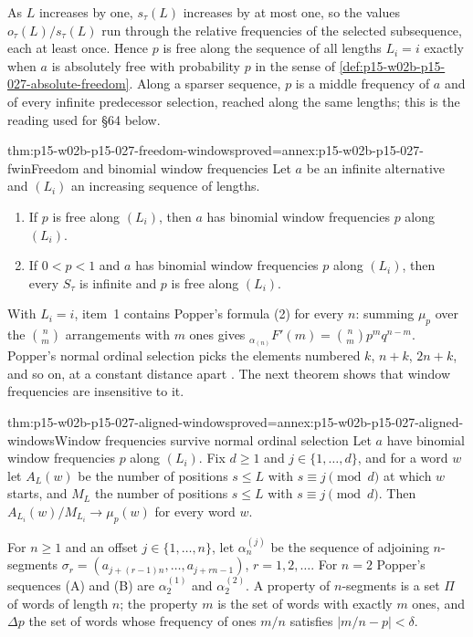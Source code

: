 As \(L\) increases by one, \(s_\tau(L)\) increases by at most one, so the
values \(o_\tau(L)/s_\tau(L)\) run through the relative frequencies of
the selected subsequence, each at least once. Hence \(p\) is free along
the sequence of all lengths \(L_i=i\) exactly when \(a\) is absolutely
free with probability \(p\) in the sense of
\cref{def:p15-w02b-p15-027-absolute-freedom}. Along a sparser sequence,
\(p\) is a middle frequency of \(a\) and of every infinite predecessor
selection, reached along the same lengths; this is the reading used
for \S64 below.

\begin{hblemma}{thm:p15-w02b-p15-027-freedom-windows}{proved=annex:p15-w02b-p15-027-fwin}{Freedom and binomial window frequencies}
Let \(a\) be an infinite alternative and \((L_i)\) an increasing
sequence of lengths.
\begin{enumerate}
\item If \(p\) is free along \((L_i)\), then \(a\) has binomial window
  frequencies \(p\) along \((L_i)\).
\item If \(0<p<1\) and \(a\) has binomial window frequencies \(p\) along
  \((L_i)\), then every \(S_\tau\) is infinite and \(p\) is free along
  \((L_i)\).
\end{enumerate}
\end{hblemma}

With \(L_i=i\), item~1 contains Popper's formula (2) for every \(n\):
summing \(\mu_p\) over the \(\binom nm\) arrangements with \(m\) ones gives
\({}_{\alpha_{(n)}}F'(m)=\binom nm p^mq^{n-m}\). Popper's normal ordinal
selection picks the elements numbered \(k\), \(n+k\), \(2n+k\), and so on,
at a constant distance apart \parencite[\S58]{Popper2002LogicDiscoveryUI}.
The next theorem shows that window frequencies are insensitive to it.

\begin{hbtheorem}{thm:p15-w02b-p15-027-aligned-windows}{proved=annex:p15-w02b-p15-027-aligned-windows}{Window frequencies survive normal ordinal selection}
Let \(a\) have binomial window frequencies \(p\) along \((L_i)\). Fix
\(d\geq1\) and \(j\in\{1,\ldots,d\}\), and for a word \(w\) let
\(A_L(w)\) be the number of positions \(s\leq L\) with
\(s\equiv j\pmod d\) at which \(w\) starts, and \(M_L\) the number of
positions \(s\leq L\) with \(s\equiv j\pmod d\). Then
\(A_{L_i}(w)/M_{L_i}\to\mu_p(w)\) for every word \(w\).
\end{hbtheorem}

For \(n\geq1\) and an offset \(j\in\{1,\ldots,n\}\), let
\(\alpha_n^{(j)}\) be the sequence of adjoining \(n\)-segments
\(\sigma_r=(a_{j+(r-1)n},\ldots,a_{j+rn-1})\), \(r=1,2,\ldots\). For
\(n=2\) Popper's sequences (A) and (B) are \(\alpha_2^{(1)}\) and
\(\alpha_2^{(2)}\). A property of \(n\)-segments is a set \(\Pi\) of
words of length \(n\); the property \(m\) is the set of words with
exactly \(m\) ones, and \(\Delta p\) the set of words whose frequency of
ones \(m/n\) satisfies \(|m/n-p|<\delta\).

